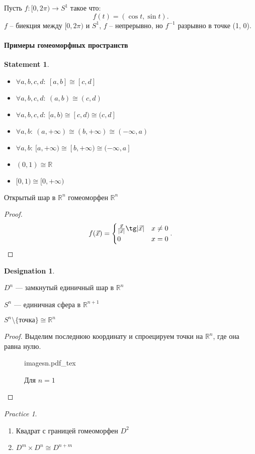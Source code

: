 \documentclass[11pt]{book}
\newcommand{\incfig}[1]{%
    \def\svgwidth{\columnwidth}
    {#1.pdf_tex}
}
\newcommand{\R}{\mathbb{R}}
\theoremstyle{definition}
\theoremstyle{plain}
\theoremstyle{plain}
\newtheorem*{st}{Statement}
\theoremstyle{definition}
\newtheorem*{name}{Designation}
\theoremstyle{remark}
\newtheorem*{prac}{Practice}
\begin{document}
Пусть $ f: [0, 2\pi) \to  S^{1}$ такое что:
\[
    f(t) = (\cos t , \sin t)
.\]
$ f$ -- биекция между $ [0, 2\pi)$ и $ S^{1}$, $ f$ -- непрерывно, но $ f^{-1} $ разрывно в точке (1, 0).
\paragraph{Примеры гомеоморфных пространств}
\begin{st}
    $ $
    \begin{itemize}
	\item $ \forall a , b, c, d: ~ [a, b] \cong [c, d]$
	\item $ \forall a, b, c, d:~ (a, b) \cong (c, d)$
	\item $ \forall a, b, c, d:~ [a, b) \cong [c, d) \cong (c, d]$
	\item $ \forall a, b: ~ (a, +\infty) \cong (b, +\infty) \cong (-\infty, a)$
	\item $ \forall a, b: ~ [a, +\infty) \cong [b, +\infty) \cong (-\infty, a]$
	\item $ (0, 1) \cong \R$
	\item $ [0, 1) \cong [0, +\infty)$
    \end{itemize}
\end{st}
\begin{thm}
    Открытый шар в $ \R^{n}$ гомеоморфен  $ \R^{n}$
\end{thm}
\begin{proof}
    \[
	f(\vec{x}) = \begin{cases}
	    \frac{\vec{x}}{|\vec{x}|} \tg |\vec{x}| & x \ne  0 \\
	    0 & x = 0
	\end{cases}
    .\] 
\end{proof}
\begin{name}
    $ $
    \begin{description}[noitemsep]
	\item 
    $ D^{n} $ --- замкнутый единичный шар в  $ \R^{n}$
\item 
    $ S^{n} $ --- единичная сфера в $ \R^{n+1}$
    \end{description}
\end{name}
\begin{thm}
    $ S^{n} \setminus \{\text{точка}\} \cong \R^{n}$
\end{thm}
\begin{proof}
    Выделим последнюю координату  и спроецируем точки на $ \R^{n} $,  где она равна нулю.
\begin{figure}[ht]
    \centering
    \incfig{imagesn}
    \caption{Для $ n = 1$}
    \label{fig:imagesn}
\end{figure}
\end{proof}
\begin{prac}
    $ $
    \begin{enumerate}
	\item Квадрат с границей гомеоморфен $ D^2$
	\item $ D^{m} \times D^{n} \cong D ^{n+m}$
    \end{enumerate}
\end{prac}
\clearpage
\end{document}
